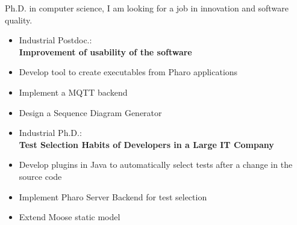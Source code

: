 \documentclass[10pt,a4paper]{altacv}
\begin{document}

\begin{fullwidth}
\makecvheader
\end{fullwidth}




Ph.D. in computer science, I am looking for a job in innovation and software quality.


\begin{itemize}	
	\item Industrial Postdoc.:\\ \textbf{Improvement of usability of the software}
	\item Develop tool to create executables from Pharo applications
	\item Implement a MQTT backend
	\item Design a Sequence Diagram Generator
\end{itemize}

\divider

\begin{itemize}	
	\item Industrial Ph.D.:\\ \textbf{Test Selection Habits of Developers in a Large IT Company}
	\item Develop plugins in Java to automatically select tests after a change in the source code
	\item Implement Pharo Server Backend for test selection
	\item Extend Moose static model
\end{itemize}
\end{document}
